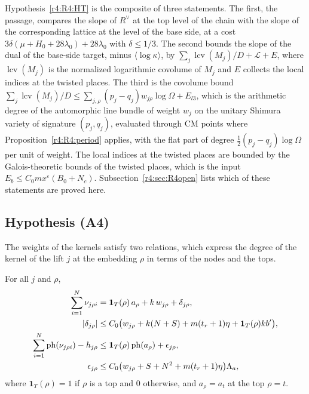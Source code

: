 \begin{remark}\label{r4:R4:HTmech}
Hypothesis~\ref{r4:R4:HT} is the composite of three statements. The first, the passage, compares the slope of $R^\vee$ at the top level of the chain with the slope of the corresponding lattice at the level of the base side, at a cost $3\delta(\mu+H_0+28\lambda_0)+28\lambda_0$ with $\delta\le1/3$. The second bounds the slope of the dual of the base-side target, minus $\langle\log\kappa\rangle$, by $\sum_j\operatorname{lcv}(M_j)/D+\mathcal L+E$, where $\operatorname{lcv}(M_j)$ is the normalized logarithmic covolume of $M_j$ and $E$ collects the local indices at the twisted places. The third is the covolume bound $\sum_j\operatorname{lcv}(M_j)/D\le\sum_{j,\rho}(p_j-q_j)w_{j\rho}\log\Omega+E_{l3}$, which is the arithmetic degree of the automorphic line bundle of weight $w_j$ on the unitary Shimura variety of signature $(p_j,q_j)$, evaluated through CM points where Proposition~\ref{r4:R4:period} applies, with the flat part of degree $\frac12(p_j-q_j)\log\Omega$ per unit of weight. The local indices at the twisted places are bounded by the Galois-theoretic bounds of the twisted places, which is the input $E_b\le C_0mx^\varepsilon(B_0+N_c)$. Subsection~\ref{r4:sec:R4open} lists which of these statements are proved here.
\end{remark}

\subsection{Hypothesis (A4)}\label{r4:sec:R4A4}

The weights of the kernels satisfy two relations, which express the degree of the kernel of the lift $j$ at the embedding $\rho$ in terms of the nodes and the tops.

\begin{hypothesis}\label{r4:R4:HW}
For all $j$ and $\rho$,
\begin{align*}
\sum_{i=1}^N\nu_{j\rho i}&=\mathbf 1_T(\rho)\,a_\rho+k\,w_{j\rho}+\delta_{j\rho},\\
\lvert\delta_{j\rho}\rvert&\le C_0\big(w_{j\rho}+k(N+S)+m(t_r+1)\eta+\mathbf 1_T(\rho)kb'\big),\\
\sum_{i=1}^N\operatorname{ph}(\nu_{j\rho i})-h_{j\rho}&\le\mathbf 1_T(\rho)\operatorname{ph}(a_\rho)+\epsilon_{j\rho},\\
\epsilon_{j\rho}&\le C_0\big(w_{j\rho}+S+N^2+m(t_r+1)\eta\big)\Lambda_a,
\end{align*}
where $\mathbf 1_T(\rho)=1$ if $\rho$ is a top and $0$ otherwise, and $a_\rho=a_t$ at the top $\rho=t$.
\end{hypothesis}

